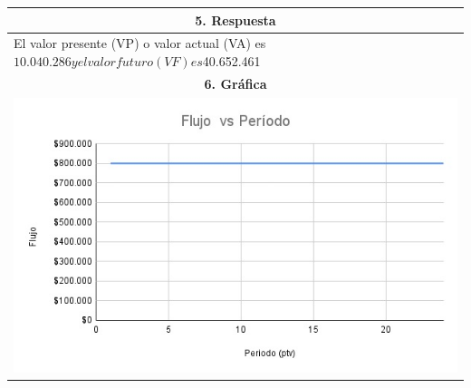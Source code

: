 \begin{center}
\begin{longtable}[H]{|p{0.333\linewidth}|p{0.3333\linewidth}|p{0.3333\linewidth}|}
  \multicolumn{3}{|c|}{\cellcolor[HTML]{FFB183}\textbf{5. Respuesta}}                                                 \\ \hline
  \multicolumn{3}{|p{\columnwidth}|}{
  El valor presente (VP) o valor actual (VA) es $10.040.286 y el valor futuro (VF) es
  $40.652.461
  }                                                                                                                   \\ \hline
  \multicolumn{3}{|c|}{\cellcolor[HTML]{FFB183}\textbf{6. Gráfica}}                                                   \\ \hline
  \multicolumn{3}{|c|}{\includegraphics[trim=-5 -5 -5 -5 ,width=0.7\columnwidth]{4/flujovsperiodo.png}}                      \\ \hline
 \end{longtable}
\end{center}
